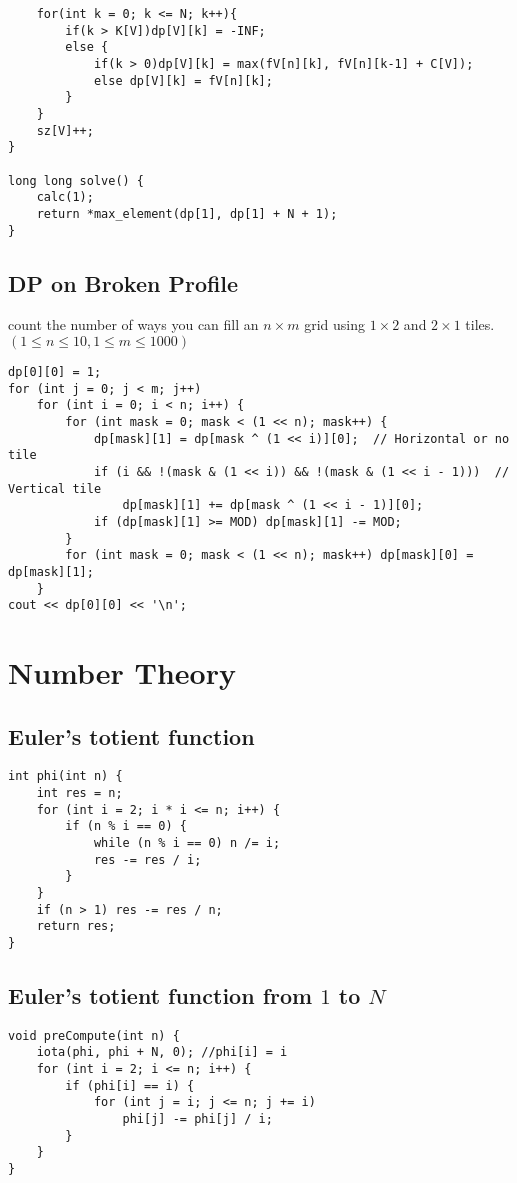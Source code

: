\documentclass[11pt,a4paper]{article}
\begin{document}
\begin{multicols*}{2}
\begin{lstlisting}
    for(int k = 0; k <= N; k++){
        if(k > K[V])dp[V][k] = -INF;                                
        else {                                                      
            if(k > 0)dp[V][k] = max(fV[n][k], fV[n][k-1] + C[V]);   
            else dp[V][k] = fV[n][k];                               
        }
    }
    sz[V]++;
}

long long solve() {
    calc(1);
    return *max_element(dp[1], dp[1] + N + 1);
}
\end{lstlisting}

\subsection{DP on Broken Profile}
count the number of ways you can fill an $n \times m$ grid using $1 \times 2$ and $2 \times 1$ tiles.
$(1 \le n \le 10, 1 \le m \le 1000)$
\begin{lstlisting}
dp[0][0] = 1;
for (int j = 0; j < m; j++)
    for (int i = 0; i < n; i++) {
        for (int mask = 0; mask < (1 << n); mask++) {
            dp[mask][1] = dp[mask ^ (1 << i)][0];  // Horizontal or no tile
            if (i && !(mask & (1 << i)) && !(mask & (1 << i - 1)))  // Vertical tile
                dp[mask][1] += dp[mask ^ (1 << i - 1)][0];
            if (dp[mask][1] >= MOD) dp[mask][1] -= MOD;
        }
        for (int mask = 0; mask < (1 << n); mask++) dp[mask][0] = dp[mask][1];
    }
cout << dp[0][0] << '\n';
\end{lstlisting}

\section{Number Theory}
\subsection{Euler's totient function}
\begin{lstlisting}
int phi(int n) {
    int res = n;
    for (int i = 2; i * i <= n; i++) {
        if (n % i == 0) {
            while (n % i == 0) n /= i;
            res -= res / i;
        }
    }
    if (n > 1) res -= res / n;
    return res;
}
\end{lstlisting}

\subsection{Euler's totient function from $1$ to $N$}
\begin{lstlisting}
void preCompute(int n) {
    iota(phi, phi + N, 0); //phi[i] = i
    for (int i = 2; i <= n; i++) {
        if (phi[i] == i) {
            for (int j = i; j <= n; j += i)
                phi[j] -= phi[j] / i;
        }
    }
}
\end{lstlisting}


\end{multicols*}
\end{document}

